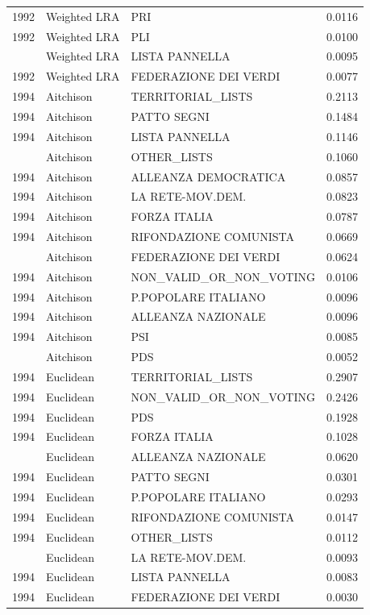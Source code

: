 \begin{longtable}[t]{rllr}
1992 & Weighted LRA & PRI & 0.0116\\
1992 & Weighted LRA & PLI & 0.0100\\
\addlinespace
1992 & Weighted LRA & LISTA PANNELLA & 0.0095\\
1992 & Weighted LRA & FEDERAZIONE DEI VERDI & 0.0077\\
1994 & Aitchison & TERRITORIAL\_LISTS & 0.2113\\
1994 & Aitchison & PATTO SEGNI & 0.1484\\
1994 & Aitchison & LISTA PANNELLA & 0.1146\\
\addlinespace
1994 & Aitchison & OTHER\_LISTS & 0.1060\\
1994 & Aitchison & ALLEANZA DEMOCRATICA & 0.0857\\
1994 & Aitchison & LA RETE-MOV.DEM. & 0.0823\\
1994 & Aitchison & FORZA ITALIA & 0.0787\\
1994 & Aitchison & RIFONDAZIONE COMUNISTA & 0.0669\\
\addlinespace
1994 & Aitchison & FEDERAZIONE DEI VERDI & 0.0624\\
1994 & Aitchison & NON\_VALID\_OR\_NON\_VOTING & 0.0106\\
1994 & Aitchison & P.POPOLARE ITALIANO & 0.0096\\
1994 & Aitchison & ALLEANZA NAZIONALE & 0.0096\\
1994 & Aitchison & PSI & 0.0085\\
\addlinespace
1994 & Aitchison & PDS & 0.0052\\
1994 & Euclidean & TERRITORIAL\_LISTS & 0.2907\\
1994 & Euclidean & NON\_VALID\_OR\_NON\_VOTING & 0.2426\\
1994 & Euclidean & PDS & 0.1928\\
1994 & Euclidean & FORZA ITALIA & 0.1028\\
\addlinespace
1994 & Euclidean & ALLEANZA NAZIONALE & 0.0620\\
1994 & Euclidean & PATTO SEGNI & 0.0301\\
1994 & Euclidean & P.POPOLARE ITALIANO & 0.0293\\
1994 & Euclidean & RIFONDAZIONE COMUNISTA & 0.0147\\
1994 & Euclidean & OTHER\_LISTS & 0.0112\\
\addlinespace
1994 & Euclidean & LA RETE-MOV.DEM. & 0.0093\\
1994 & Euclidean & LISTA PANNELLA & 0.0083\\
1994 & Euclidean & FEDERAZIONE DEI VERDI & 0.0030\\

\end{longtable}

